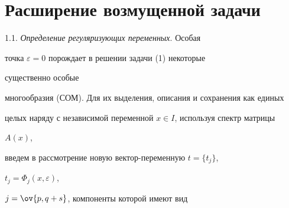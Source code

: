  


\section{Расширение возмущенной задачи} 


 


1.1. {\it Определение регуляризующих переменных}. Особая 


точка $\varepsilon=0$ порождает в решении задачи (1) некоторые 


существенно особые 


многообразия (СОМ). Для их выделения, описания и сохранения как единых 


целых наряду с независимой переменной $x\in I$, используя спектр матрицы 


$A(x)$, 


введем в рассмотрение новую вектор-переменную $t=\{t_j\}$, 


$t_j=\Phi_j(x,\varepsilon)$, 


$j=\ov{p,q+s}$, компоненты которой имеют вид 


